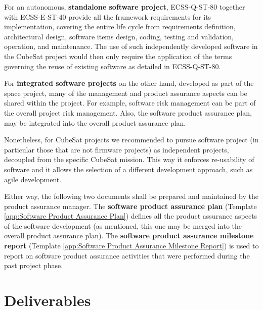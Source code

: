 For an autonomous, \textbf{standalone software project}, ECSS-Q-ST-80 together with ECSS-E-ST-40 \cite{ECSS-E-ST-40} provide all the framework requirements for its implementation, covering the entire life cycle from requirements definition, architectural design, software items design, coding, testing and validation, operation, and maintenance. The use of such independently developed software in the CubeSat project would then only require the application of the terms governing the reuse of existing software as detailed in ECSS-Q-ST-80.

For \textbf{integrated software projects} on the other hand, developed as part of the space project, many of the management and product assurance aspects can be shared within the project. For example, software risk management can be part of the overall project risk management. Also, the software product assurance plan, may be integrated into the overall product assurance plan. 

Nonetheless, for CubeSat projects we recommended to pursue software project (in particular those that are not firmware projects) as independent projects, decoupled from the specific CubeSat mission. This way it enforces re-usability of software and it allows the selection of a different development approach, such as agile development. 

Either way, the following two documents shall be prepared and maintained by the product assurance manager. The \textbf{software product assurance plan} (Template \ref{app:Software Product Assurance Plan}) defines all the product assurance aspects of the software development (as mentioned, this one may be merged into the overall product assurance plan). The \textbf{software product assurance milestone report} (Template \ref{app:Software Product Assurance Milestone Report}) is used to report on software product assurance activities that were performed during the past project phase.

\clearpage
\section{Deliverables}

